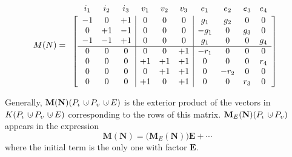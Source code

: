 \documentclass[12pt]{article}
\theoremstyle{definition}
\newcommand{\dunion}
{\mbox{\hbox{\hskip6pt$\cdot$\hskip-5.50pt$\cup$\hskip2pt}}}
\newcommand{\Is}{\ensuremath{\iota}}
\newcommand{\Vs}{\ensuremath{\upsilon}}
\newcommand{\FieldK}{\ensuremath{K}}
\newcommand{\ext}[1]{\ensuremath{\mathbf{#1}}}
\begin{document}

\[
M(N)=
\begin{array}{c}
\begin{array}{cccccccccc}
i_1 & i_2 & i_3 & v_1 & v_2 & v_3  & e_1  & e_2 & e_3 & e_4 \\[-1em]
\hphantom{+1}&\hphantom{+1}&\hphantom{+1}&
\hphantom{+1}&\hphantom{+1}&\hphantom{+1}&
\hphantom{+g_1}&\hphantom{-g_1}&\hphantom{g_3}&\hphantom{g_4}
\end{array}\\
\left[\begin{array}{ccc|ccc|cccc}
 -1 &  0  &  +1 &   0 &  0  &   0  & g_1  & g_2 &  0  & 0   \\ 
  0 & +1  &  -1 &   0 &  0  &   0  & -g_1 &   0 & g_3 & 0   \\ 
 -1 & -1  &  +1 &   0 &  0  &   0  & g_1  &   0 &  0  & g_4   \\ \hline
  0 &  0  &   0 &  0  &  0  &  +1  &-r_1  &   0 &  0  & 0 \\
  0 &  0  &   0 & +1  &  +1 &  +1  &   0  &   0 &  0  & r_4\\
  0 &  0  &   0 &  0  &  +1 &  +1  &   0  &-r_2 &  0  &  0\\
  0 &  0  &   0 & +1  &   0 &  +1  &   0  &   0 & r_3 &  0
\end{array}\right]
\end{array}
\]


Generally, $\ext{M}(\ext{N})(P_{\Is}\dunion P_{\Vs}\dunion E)$
is the exterior product of the vectors in
$\FieldK (P_{\Is}\dunion P_{\Vs}\dunion E)$ corresponding to the
rows of this matrix.
$\ext{M}_E(\ext{N})(P_{\Is}\dunion P_{\Vs})$ appears
in the expression
\[
\ext{M}(\ext{N})=\big(\ext{M}_E(\ext{N})\big)\ext{E} + \cdots
\]
where the initial term is the only one with factor $\ext{E}$.
\end{document}
